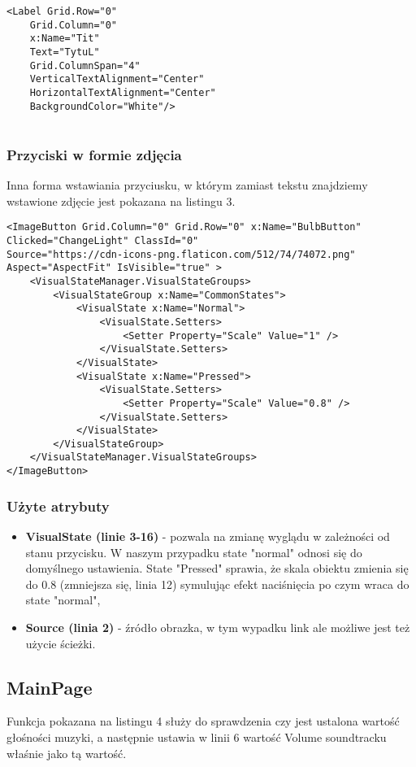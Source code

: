 \begin{lstlisting}[caption=Label]
	<Label Grid.Row="0" 
	Grid.Column="0" 
	x:Name="Tit" 
	Text="TytuL" 
	Grid.ColumnSpan="4" 
	VerticalTextAlignment="Center" 
	HorizontalTextAlignment="Center" 
	BackgroundColor="White"/>
	
\end{lstlisting}
\subsubsection{Przyciski w formie zdjęcia}
Inna forma wstawiania przyciusku, w którym zamiast tekstu znajdziemy wstawione zdjęcie jest pokazana na listingu 3.
\begin{lstlisting}[caption=ImageButton]
<ImageButton Grid.Column="0" Grid.Row="0" x:Name="BulbButton" Clicked="ChangeLight" ClassId="0" 
Source="https://cdn-icons-png.flaticon.com/512/74/74072.png" Aspect="AspectFit" IsVisible="true" >
	<VisualStateManager.VisualStateGroups>
		<VisualStateGroup x:Name="CommonStates">
			<VisualState x:Name="Normal">
				<VisualState.Setters>
					<Setter Property="Scale" Value="1" />
				</VisualState.Setters>
			</VisualState>
			<VisualState x:Name="Pressed">
				<VisualState.Setters>
					<Setter Property="Scale" Value="0.8" />
				</VisualState.Setters>
			</VisualState>
		</VisualStateGroup>
	</VisualStateManager.VisualStateGroups>
</ImageButton>
\end{lstlisting}

\subsubsection{Użyte atrybuty}
\begin{itemize}
	\item \textbf{VisualState  (linie 3-16)} - pozwala na zmianę wyglądu w zależności od stanu przycisku. W naszym przypadku state "normal" odnosi się do domyślnego ustawienia. State "Pressed" sprawia, że skala obiektu zmienia się do 0.8 (zmniejsza się, linia 12) symulując efekt naciśnięcia po czym wraca do state "normal",
	\item \textbf{Source (linia 2)} - źródło obrazka, w tym wypadku link ale możliwe jest też użycie ścieżki. 
\end{itemize}
\subsection{MainPage}
Funkcja pokazana na listingu 4 służy do sprawdzenia czy jest ustalona wartość głośności muzyki, a następnie ustawia w linii 6 wartość Volume soundtracku właśnie jako tą wartość.

